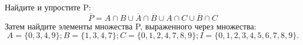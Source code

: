 \question
Найдите и упростите P:
\begin{equation*}
\overline{P} = A \cap B \cup \overline{A} \cap \overline{B} \cup A \cap C \cup \overline{B} \cap C
\end{equation*}
Затем найдите элементы множества P, выраженного через множества:
\begin{equation*}
A = \{0, 3, 4, 9\}; 
B = \{1, 3, 4, 7\};
C = \{0, 1, 2, 4, 7, 8, 9\};
I = \{0, 1, 2, 3, 4, 5, 6, 7, 8, 9\}.
\end{equation*}